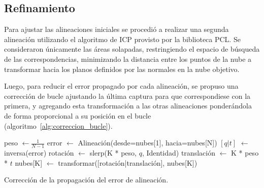 	\subsection{Refinamiento}
	Para ajustar las alineaciones iniciales se procedió a realizar una segunda alineación utilizando
	el algoritmo de ICP provisto por la biblioteca PCL.
	Se consideraron únicamente las áreas solapadas, restringiendo el espacio de
	búsqueda de las correspondencias, minimizando la distancia entre los puntos
	de la nube a transformar hacia los planos definidos por las normales en la nube objetivo.

	\clearpage
	Luego, para reducir el error propagado por cada alineación, se propuso una
	corrección de bucle
	ajustando la última captura para que correspondiese con la primera,
	y agregando esta transformación a las otras alineaciones ponderándola de forma
	proporcional a su posición en el bucle (algoritmo~\ref{alg:correccion_bucle}).

	\begin{algorithm}
		\begin{algorithmic}[1]
				\State peso $\gets \frac{1}{N-1}$
				\State error $\gets$ Alineación(desde=nubes[1], hacia=nubes[N])
				\State $[q|t]$ $\gets$ inversa(error)
					\State rotación $\gets$ slerp(K * peso, $q$, Identidad)
					\State translación $\gets$ K * peso * $t$
					\State nubes[K] $\gets$ transformar([rotación|translación], nubes[K])
				\EndFor
			\EndFunction
		\end{algorithmic}
		\caption{\label{alg:correccion_bucle}Corrección de la propagación del error de alineación.}
	\end{algorithm}
